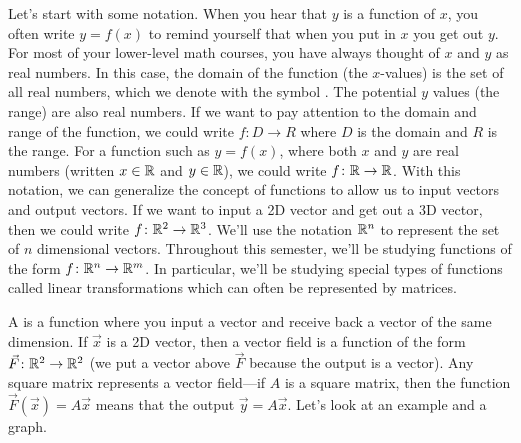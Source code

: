 Let's start with some notation. 
When you hear that $y$ is a function of $x$, you often write $y=f(x)$ to remind yourself that when you put in $x$ you get out $y$. 
For most of your lower-level math courses, you have always thought of $x$ and $y$ as real numbers. 
In this case, the domain of the function (the $x$-values) is the set of all real numbers, which we denote with the symbol \RR.  
The potential $y$ values (the range) are also real numbers.  
If we want to pay attention to the domain and range of the function, we could write $f\colon D\to R$  where $D$ is the domain and $R$ is the range.  
For a function such as $y=f(x)$, where both $x$ and $y$ are real numbers (written $x\in \mathbb{R}$ and $y\in \mathbb{R}$), we could write $f\colon{\ensuremath{\mathbb{R}}}\to{\ensuremath{\mathbb{R}}}$. 
With this notation, we can generalize the concept of functions to allow us to input vectors and output vectors.  
If we want to input a 2D vector and get out a 3D vector, then we could write $f\colon{\ensuremath{\mathbb{R}}}^2\to{\ensuremath{\mathbb{R}}}^3$.  
We'll use the notation ${\mathbb{R}}^n$ to represent the set of $n$ dimensional vectors. 
Throughout this semester, we'll be studying functions of the form $f\colon{\ensuremath{\mathbb{R}}}^n\to {\ensuremath{\mathbb{R}}}^m$. In particular, we'll be studying special types of functions called linear transformations which can often be represented by matrices.

A  is a function where you input a vector and receive back a vector of the same dimension. 
%
If $\vec x$ is a 2D vector, then a vector field is a function of the form $\vec F\colon{\ensuremath{\mathbb{R}}}^2\to {\ensuremath{\mathbb{R}}}^2$ (we put a vector above $\vec F$ because the output is a vector).  
Any square matrix represents a vector field---if $A$ is a square matrix, then the function $\vec F(\vec x) = A\vec x$ means that the output $\vec y=A\vec x$. Let's look at an example and a graph.


